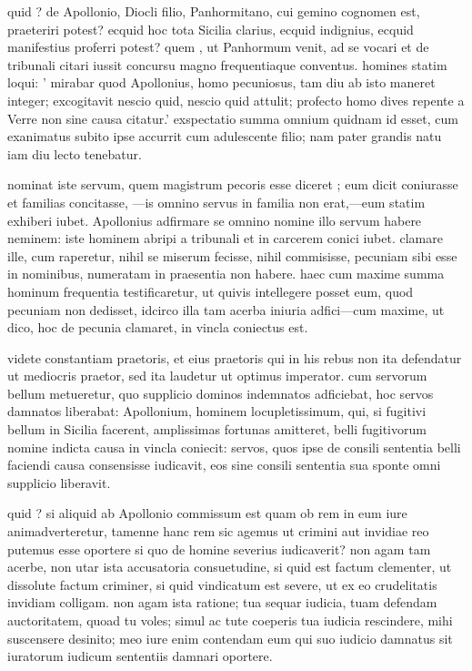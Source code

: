  quid ? de Apollonio, Diocli filio, Panhormitano, cui gemino cognomen est, praeteriri potest? ecquid hoc tota Sicilia clarius, ecquid indignius, ecquid manifestius proferri potest? quem , ut Panhormum venit, ad se vocari et de tribunali citari iussit concursu magno frequentiaque conventus. homines statim loqui: ' mirabar quod Apollonius, homo pecuniosus, tam diu ab isto maneret integer; excogitavit nescio quid, nescio quid attulit; profecto homo dives repente a Verre non sine causa citatur.' exspectatio summa omnium quidnam id esset, cum exanimatus subito ipse accurrit cum adulescente filio; nam pater grandis natu iam diu lecto tenebatur.

 nominat iste servum, quem magistrum pecoris esse diceret ; eum dicit coniurasse et familias concitasse, —is omnino servus in familia non erat,—eum statim exhiberi iubet. Apollonius adfirmare se omnino nomine illo servum habere neminem: iste hominem abripi a tribunali et in carcerem conici iubet. clamare ille, cum raperetur, nihil se miserum fecisse, nihil commisisse, pecuniam sibi esse in nominibus, numeratam in praesentia non habere. haec cum maxime summa hominum frequentia testificaretur, ut quivis intellegere posset eum, quod pecuniam non dedisset, idcirco illa tam acerba iniuria adfici—cum maxime, ut dico, hoc de pecunia clamaret, in vincla coniectus est.

 videte constantiam praetoris, et eius praetoris qui in his rebus non ita defendatur ut mediocris praetor, sed ita laudetur ut optimus imperator. cum servorum bellum metueretur, quo supplicio dominos indemnatos adficiebat, hoc servos damnatos liberabat: Apollonium, hominem locupletissimum, qui, si fugitivi bellum in Sicilia facerent, amplissimas fortunas amitteret, belli fugitivorum nomine indicta causa in vincla coniecit: servos, quos ipse de consili sententia belli faciendi causa consensisse iudicavit, eos sine consili sententia sua sponte omni supplicio liberavit.

 quid ? si aliquid ab Apollonio commissum est quam ob rem in eum iure animadverteretur, tamenne hanc rem sic agemus ut crimini aut invidiae reo putemus esse oportere si quo de homine severius iudicaverit? non agam tam acerbe, non utar ista accusatoria consuetudine, si quid est factum clementer, ut dissolute factum criminer, si quid vindicatum est severe, ut ex eo crudelitatis invidiam colligam. non agam ista ratione; tua sequar iudicia, tuam defendam auctoritatem, quoad tu voles; simul ac tute coeperis tua iudicia rescindere, mihi suscensere desinito; meo iure enim contendam eum qui suo iudicio damnatus sit iuratorum iudicum sententiis damnari oportere.

